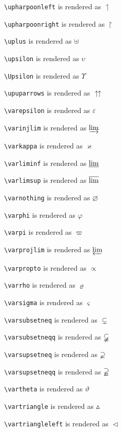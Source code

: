 \texttt{\textbackslash upharpoonleft} is rendered as $\upharpoonleft$


\texttt{\textbackslash upharpoonright} is rendered as $\upharpoonright$


\texttt{\textbackslash uplus} is rendered as $\uplus$


\texttt{\textbackslash upsilon} is rendered as $\upsilon$


\texttt{\textbackslash Upsilon} is rendered as $\Upsilon$


\texttt{\textbackslash upuparrows} is rendered as $\upuparrows$


\texttt{\textbackslash varepsilon} is rendered as $\varepsilon$


\texttt{\textbackslash varinjlim} is rendered as $\varinjlim$


\texttt{\textbackslash varkappa} is rendered as $\varkappa$


\texttt{\textbackslash varliminf} is rendered as $\varliminf$


\texttt{\textbackslash varlimsup} is rendered as $\varlimsup$


\texttt{\textbackslash varnothing} is rendered as $\varnothing$


\texttt{\textbackslash varphi} is rendered as $\varphi$


\texttt{\textbackslash varpi} is rendered as $\varpi$


\texttt{\textbackslash varprojlim} is rendered as $\varprojlim$


\texttt{\textbackslash varpropto} is rendered as $\varpropto$


\texttt{\textbackslash varrho} is rendered as $\varrho$


\texttt{\textbackslash varsigma} is rendered as $\varsigma$


\texttt{\textbackslash varsubsetneq} is rendered as $\varsubsetneq$


\texttt{\textbackslash varsubsetneqq} is rendered as $\varsubsetneqq$


\texttt{\textbackslash varsupsetneq} is rendered as $\varsupsetneq$


\texttt{\textbackslash varsupsetneqq} is rendered as $\varsupsetneqq$


\texttt{\textbackslash vartheta} is rendered as $\vartheta$


\texttt{\textbackslash vartriangle} is rendered as $\vartriangle$


\texttt{\textbackslash vartriangleleft} is rendered as $\vartriangleleft$


